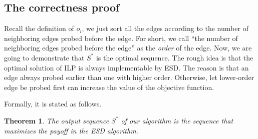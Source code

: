 \documentclass[letterpaper]{article}
\newtheorem{theorem}{Theorem}%
\begin{document}
\subsection{The correctness proof}
Recall the definition of $o_i$, we just sort all the edges according to the number of neighboring edges probed before the edge.
For short, we call ``the number of neighboring edges probed before the edge'' as the \textit{order} of the edge.
Now, we are going to demonstrate that $S^*$ is the optimal sequence.
The rough idea is that the optimal solution of ILP is always implementable by ESD.
The reason is that an edge always probed earlier than one with higher order.
Otherwise, let lower-order edge be probed first can increase the value of the objective function.

Formally, it is stated as follows.

\begin{theorem}
	The output sequence $S^*$ of our algorithm is the sequence that maximizes the payoff in the ESD algorithm.
\end{theorem}
\end{document}
